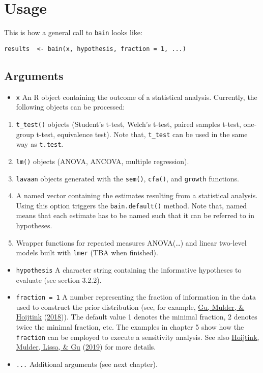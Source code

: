 \documentclass[
]{book}
\providecommand{\tightlist}{%
  \setlength{\itemsep}{0pt}\setlength{\parskip}{0pt}}
\begin{document}
\hypertarget{usage}{%
\section{Usage}\label{usage}}

This is how a general call to \texttt{bain} looks like:

\texttt{results\ \ \textless{}-\ bain(x,\ hypothesis,\ fraction\ =\ 1,\ ...)}

\hypertarget{arguments}{%
\subsection{Arguments}\label{arguments}}

\begin{itemize}
\tightlist
\item
  \texttt{x}
  An R object containing the outcome of a statistical analysis. Currently, the following objects can be processed:
\end{itemize}

\begin{enumerate}
\def\labelenumi{\arabic{enumi})}
\tightlist
\item
  \texttt{t\_test()} objects (Student's t-test, Welch's t-test, paired samples t-test, one-group t-test, equivalence test). Note that, \texttt{t\_test} can be used in the same way as \texttt{t.test}.
\item
  \texttt{lm()} objects (ANOVA, ANCOVA, multiple regression).
\item
  \texttt{lavaan} objects generated with the \texttt{sem()}, \texttt{cfa()}, and
  \texttt{growth} functions.
\item
  A named vector containing the estimates resulting from a statistical analysis. Using this option triggers the \texttt{bain.default()} method. Note that, named means that each estimate has to be named such that it can be referred to in hypotheses.
\item
  Wrapper functions for repeated measures ANOVA(\ldots) and linear two-level models built with \texttt{lmer} (TBA when finished).
\end{enumerate}

\begin{itemize}
\item
  \texttt{hypothesis} A character string containing the informative hypotheses to evaluate
  (see section 3.2.2).
\item
  \texttt{fraction\ =\ 1} A number representing the fraction of information in the data used to construct the prior distribution (see, for example, \protect\hyperlink{ref-gu2018approximated}{Gu, Mulder, \& Hoijtink} (\protect\hyperlink{ref-gu2018approximated}{2018})). The default value 1 denotes the minimal fraction, 2 denotes twice the minimal fraction, etc. The examples in chapter 5 show how the \texttt{fraction} can be employed to execute a sensitivity analysis. See also \protect\hyperlink{ref-hoijtink2019tutorial}{Hoijtink, Mulder, Lissa, \& Gu} (\protect\hyperlink{ref-hoijtink2019tutorial}{2019}) for more details.
\item
  \texttt{...} Additional arguments (see next chapter).
\end{itemize}
\end{document}
